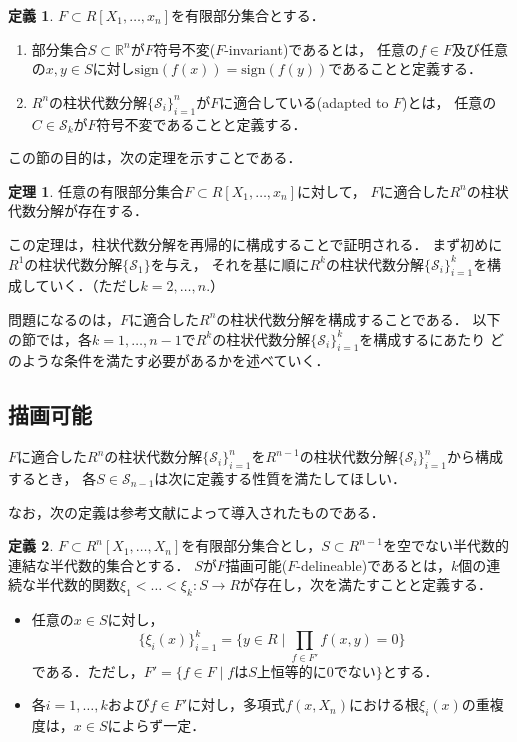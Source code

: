 \documentclass[uplatex, dvipdfmx]{jsarticle}
\newcommand{\R}{\mathbb{R}}
\newcommand{\calS}{\mathcal{S}}
\newcommand{\sign}{\mathrm{sign}}
\newcommand{\map}[3]{{#1}:{#2}\rightarrow{#3}}
\theoremstyle{definition}
\newtheorem{definition}{定義}[section]
\newtheorem{theorem}{定理}[section]
\begin{document}
\begin{definition}
     $F \subset R[X_1, \dots, x_n]$を有限部分集合とする．
     \begin{enumerate}
          \item 部分集合$S \subset \R^n$が$F$符号不変($F$-invariant)であるとは，
          任意の$f \in F$及び任意の$x,y \in S$に対し$\sign(f(x))=\sign(f(y))$であることと定義する．
          \item $R^n$の柱状代数分解$\{\calS_i\}_{i=1}^n$が$F$に適合している(adapted to $F$)とは，
          任意の$C \in \calS_k$が$F$符号不変であることと定義する．
     \end{enumerate}
\end{definition}

この節の目的は，次の定理を示すことである．

\begin{theorem} \label{theorem:cad}
     任意の有限部分集合$F \subset R[X_1, \dots, x_n]$に対して，
     $F$に適合した$R^n$の柱状代数分解が存在する．
\end{theorem}

この定理は，柱状代数分解を再帰的に構成することで証明される．
まず初めに$R^1$の柱状代数分解$\{\calS_1\}$を与え，
それを基に順に$R^k$の柱状代数分解$\{\calS_i\}_{i=1}^k$を構成していく．（ただし$k=2, \dots, n$.）

問題になるのは，$F$に適合した$R^n$の柱状代数分解を構成することである．
以下の節では，各$k=1, \dots, n-1$で$R^k$の柱状代数分解$\{\calS_i\}_{i=1}^k$を構成するにあたり
どのような条件を満たす必要があるかを述べていく．

\subsection{描画可能}
$F$に適合した$R^n$の柱状代数分解$\{\calS_i\}_{i=1}^n$を$R^{n-1}$の柱状代数分解$\{\calS_i\}_{i=1}^n$から構成するとき，
各$S \in \calS_{n-1}$は次に定義する性質を満たしてほしい．

なお，次の定義は参考文献\cite{Collins}によって導入されたものである．

\begin{definition} 
     $F \subset R^n[X_1, \dots, X_n]$を有限部分集合とし，$S \subset R^{n-1}$を空でない半代数的連結な半代数的集合とする．
     $S$が$F$描画可能($F$-delineable)であるとは，$k$個の連続な半代数的関数$\map{\xi_1<\dots<\xi_k}{S}{R}$が存在し，次を満たすことと定義する．
     \begin{itemize}
          \item 任意の$ x \in S $に対し，
          \[
               \{\xi_i(x)\}_{i=1}^k = \{y \in R \mid \prod_{f \in F'}f(x,y)=0\}
          \]
          である．ただし，$F' = \{f \in F \mid \text{$f$は$S$上恒等的に0でない}\}$とする．
          \item 各$i=1, \dots, k$および$f \in F'$に対し，多項式$f(x,X_n)$における根$\xi_i(x)$の重複度は，$x\in S$によらず一定．
     \end{itemize}
\end{definition}
\end{document}
